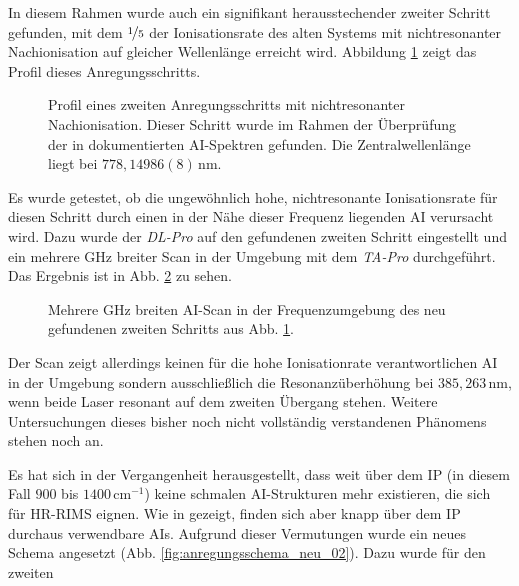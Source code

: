 In diesem Rahmen wurde auch ein signifikant herausstechender zweiter Schritt
gefunden, mit dem $\nicefrac{1}{5}$ der Ionisationsrate des alten Systems mit
nichtresonanter Nachionisation auf gleicher Wellenlänge erreicht wird. Abbildung
\ref{fig:linienscans_neues_schema_01_fake_AI_krass_mean} zeigt das Profil dieses
Anregungsschritts.
\begin{figure}[h]
 	\centering
 	\footnotesize
	
	\caption[zweiter Schritt aus AI-Spektren]{Profil eines zweiten
	Anregungsschritts mit nichtresonanter Nachionisation. Dieser Schritt wurde im
	Rahmen der Überprüfung der in \cite{raeder:2011:dissertation} dokumentierten
	AI-Spektren gefunden. Die Zentralwellenlänge liegt bei $778,14986(8)\,$nm.}
	\label{fig:linienscans_neues_schema_01_fake_AI_krass_mean}
\end{figure}
Es wurde getestet, ob die ungewöhnlich hohe, nichtresonante Ionisationsrate für
diesen Schritt durch einen in der Nähe dieser Frequenz liegenden AI verursacht
wird. Dazu wurde der \textit{DL-Pro} auf den gefundenen zweiten Schritt
eingestellt und ein mehrere GHz breiter Scan in der Umgebung mit dem \textit{TA-Pro} durchgeführt.
Das Ergebnis ist in Abb.
\ref{fig:linienscans_neues_schema_01_fake_AI_krass_umgebung_mean} zu sehen.
\begin{figure}[h]
 	\centering
 	\footnotesize
	
	\caption[zweiter Schritt aus AI-Spektren, Umgebungsscan]{Mehrere GHz breiten
	AI-Scan in der Frequenzumgebung des neu gefundenen zweiten Schritts aus Abb.
	\ref{fig:linienscans_neues_schema_01_fake_AI_krass_mean}.}
	\label{fig:linienscans_neues_schema_01_fake_AI_krass_umgebung_mean}
\end{figure}
Der Scan zeigt allerdings keinen für die hohe Ionisationrate verantwortlichen AI
in der Umgebung sondern ausschließlich die Resonanzüberhöhung bei
$385,263\,$nm, wenn beide Laser resonant auf dem zweiten Übergang stehen.
Weitere Untersuchungen dieses bisher noch nicht vollständig verstandenen
Phänomens stehen noch an.\par
Es hat sich in der Vergangenheit herausgestellt, dass weit
über dem IP (in diesem Fall $900$ bis $1400\,$cm$^{-1}$) keine
schmalen AI-Strukturen mehr existieren, die sich für HR-RIMS eignen. Wie in
\cite{Bushaw2007485} gezeigt, finden sich aber knapp über dem IP durchaus verwendbare AIs.
Aufgrund dieser Vermutungen wurde ein neues Schema angesetzt
(Abb. \ref{fig:anregungsschema_neu_02}). Dazu wurde für den zweiten
